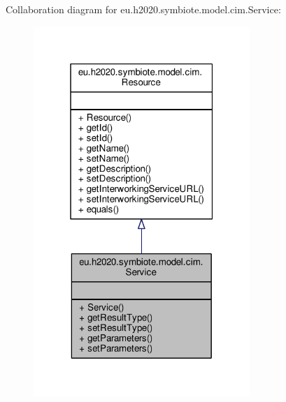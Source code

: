 Collaboration diagram for eu.\+h2020.\+symbiote.\+model.\+cim.\+Service\+:\nopagebreak
\begin{figure}[H]
\begin{center}
\leavevmode
\includegraphics[width=232pt]{classeu_1_1h2020_1_1symbiote_1_1model_1_1cim_1_1Service__coll__graph}
\end{center}
\end{figure}
